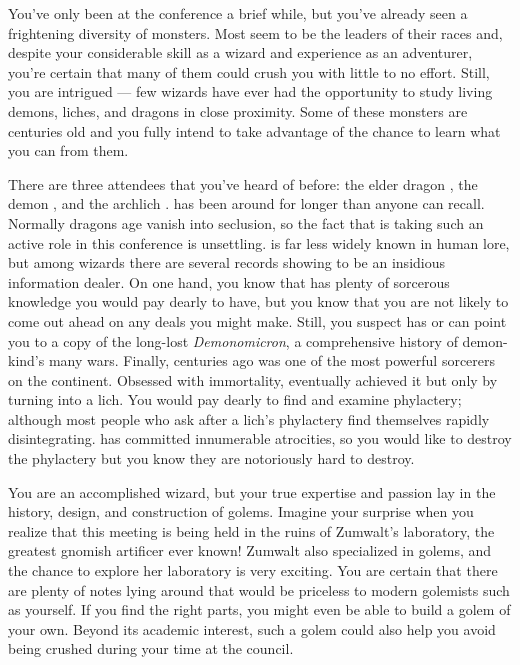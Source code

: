 \documentclass[char]{guildcamp2}
\begin{document}
You've only been at the conference a brief while, but you've already seen a frightening diversity of monsters. Most seem to be the leaders of their races and, despite your considerable skill as a wizard and experience as an adventurer, you're certain that many of them could crush you with little to no effort. Still, you are intrigued --- few wizards have ever had the opportunity to study living demons, liches, and dragons in close proximity. Some of these monsters are centuries old and you fully intend to take advantage of the chance to learn what you can from them.

There are three attendees that you've heard of before: the elder dragon \cOnyx{}, the demon \cDemon{\intro}, and the archlich \cLich{\intro}. \cOnyx{} has been around for longer than anyone can recall. Normally dragons \cOnyx{\their} age vanish into seclusion, so the fact that \cOnyx{\they} is taking such an active role in this conference is unsettling. \cDemon{} is far less widely known in human lore, but among wizards there are several records showing \cDemon{\them} to be an insidious information dealer. On one hand, you know that \cDemon{\they} has plenty of sorcerous knowledge you would pay dearly to have, but you know that you are not likely to come out ahead on any deals you might make. Still, you suspect \cDemon{} has or can point you to a copy of the long-lost \emph{Demonomicron}, a comprehensive history of demon-kind's many wars. Finally, centuries ago \cLich{} was one of the most powerful sorcerers on the continent. Obsessed with immortality, \cLich{\they} eventually achieved it but only by turning into a lich. You would pay dearly to find and examine \cLich{\their} phylactery; although most people who ask after a lich's phylactery find themselves rapidly disintegrating. \cLich{} has committed innumerable atrocities, so you would like to destroy the phylactery but you know they are notoriously hard to destroy.

You are an accomplished wizard, but your true expertise and passion lay in the history, design, and construction of golems. Imagine your surprise when you realize that this meeting is being held in the ruins of Zumwalt's laboratory, the greatest gnomish artificer ever known! Zumwalt also specialized in golems, and the chance to explore her laboratory is very exciting. You are certain that there are plenty of notes lying around that would be priceless to modern golemists such as yourself. If you find the right parts, you might even be able to build a golem of your own. Beyond its academic interest, such a golem could also help you avoid being crushed during your time at the council.
\end{document}
